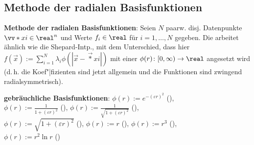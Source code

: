 \pagebreak

\subsection{%
    Methode der radialen Basisfunktionen%
}

\textbf{Methode der radialen Basisfunktionen}:
Seien $N$ paarw. disj. Datenpunkte $\vec*{x}{i} \in \real^n$ und Werte $f_i \in \real$
für $i = 1, \dotsc, N$ gegeben.
Die  arbeitet ähnlich wie die Shepard-Intp.,
mit dem Unterschied, dass hier $f(\vec{x}) := \sum_{i=1}^N \lambda_i \phi(|\vec{x} - \vec*{x}{i}|)$
mit einer  $\phi(r)\colon [0, \infty) \to \real$
angesetzt wird (d.\,h. die Koef"|fizienten sind jetzt allgemein und
die Funktionen sind zwingend radialsymmetrisch).

\textbf{gebräuchliche Basisfunktionen}:
$\phi(r) := e^{-(\varepsilon r)^2}$
(),\\
$\phi(r) := \frac{1}{1 + (\varepsilon r)^2}$
(),
$\phi(r) := \frac{1}{\sqrt{1 + (\varepsilon r)^2}}$
(),\\
$\phi(r) := \sqrt{1 + (\varepsilon r)^2}$
(),
$\phi(r) := r$
(),
$\phi(r) := r^3$
(),\\
$\phi(r) := r^2 \ln r$
()
%
%
%
%
%
%

